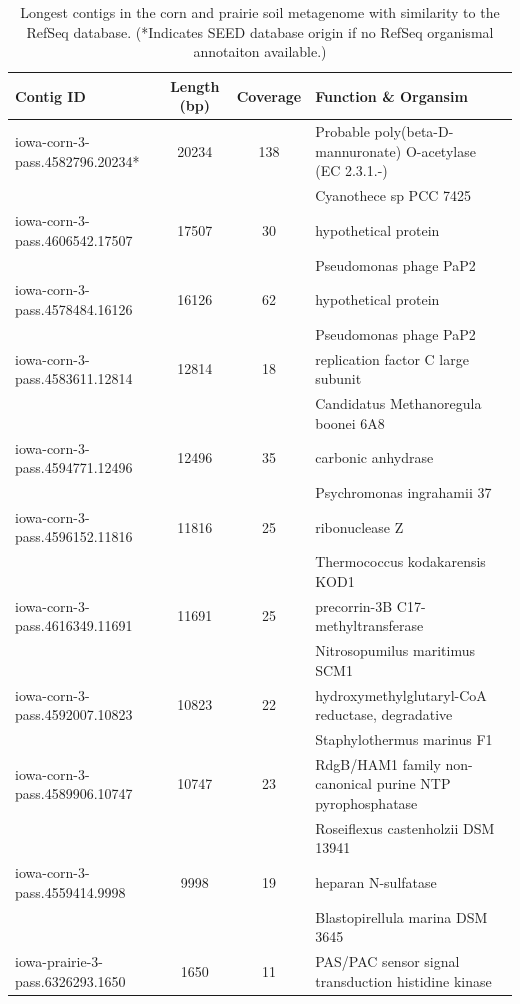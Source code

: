 \documentclass{pnastwo}
\begin{document}
\begin{table}
\caption{Longest contigs in the corn and prairie soil metagenome with similarity to the RefSeq database. (*Indicates SEED database origin if no RefSeq organismal annotaiton available.)}
\begin{tabular}{@{\extracolsep{\fill}}lccl}
Contig ID & Length (bp) & Coverage &  Function \& Organsim \\
 \hline
iowa-corn-3-pass.4582796.20234*	&	20234	&	138	&	Probable poly(beta-D-mannuronate) O-acetylase (EC 2.3.1.-)	\\
	&		&		&	Cyanothece sp PCC 7425	\\
iowa-corn-3-pass.4606542.17507	&	17507	&	30	&	hypothetical protein	\\
	&		&		&	Pseudomonas phage PaP2	\\
iowa-corn-3-pass.4578484.16126	&	16126	&	62	&	hypothetical protein	\\
	&		&		&	Pseudomonas phage PaP2	\\
iowa-corn-3-pass.4583611.12814	&	12814	&	18	&	replication factor C large subunit	\\
	&		&		&	Candidatus Methanoregula boonei 6A8	\\
iowa-corn-3-pass.4594771.12496	&	12496	&	35	&	carbonic anhydrase	\\
	&		&		&	Psychromonas ingrahamii 37	\\
iowa-corn-3-pass.4596152.11816	&	11816	&	25	&	ribonuclease Z	\\
	&		&		&	Thermococcus kodakarensis KOD1	\\
iowa-corn-3-pass.4616349.11691	&	11691	&	25	&	precorrin-3B C17-methyltransferase	\\
	&		&		&	Nitrosopumilus maritimus SCM1	\\
iowa-corn-3-pass.4592007.10823	&	10823	&	22	&	hydroxymethylglutaryl-CoA reductase, degradative	\\
	&		&		&	Staphylothermus marinus F1	\\
iowa-corn-3-pass.4589906.10747	&	10747	&	23	&	RdgB/HAM1 family non-canonical purine NTP pyrophosphatase	\\
	&		&		&	Roseiflexus castenholzii DSM 13941	\\
iowa-corn-3-pass.4559414.9998&	9998	&	19	&	heparan N-sulfatase	\\
	&		&		&	Blastopirellula marina DSM 3645	\\
iowa-prairie-3-pass.6326293.1650	&	1650	&	11	&	PAS/PAC sensor signal transduction histidine kinase	\\

\end{tabular}
\end{table}
\end{document}
